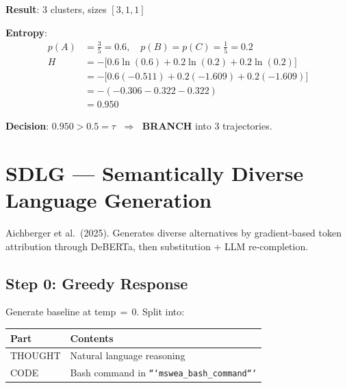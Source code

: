 \documentclass[10pt,a4paper,twocolumn]{article}
\begin{document}
\textbf{Result}: 3 clusters, sizes $[3, 1, 1]$

\textbf{Entropy}:
\begin{align*}
p(A) &= \tfrac{3}{5} = 0.6, \quad p(B) = p(C) = \tfrac{1}{5} = 0.2 \\[4pt]
H &= -\bigl[0.6\ln(0.6) + 0.2\ln(0.2) + 0.2\ln(0.2)\bigr] \\
  &= -\bigl[0.6(-0.511) + 0.2(-1.609) + 0.2(-1.609)\bigr] \\
  &= -(-0.306 - 0.322 - 0.322) \\
  &= \mathbf{0.950}
\end{align*}

\textbf{Decision}: $0.950 > 0.5 = \tau$ $\;\Longrightarrow\;$ \textbf{BRANCH} into 3 trajectories.


\section{SDLG --- Semantically Diverse Language Generation}

Aichberger et al.\ (2025). Generates diverse alternatives by gradient-based token attribution through DeBERTa, then substitution + LLM re-completion.

\begin{center}
\end{center}

\subsection{Step 0: Greedy Response}

Generate baseline at temp$\,{=}\,$0. Split into:

\begin{small}
\begin{tabular}{@{}ll@{}}
\toprule
\textbf{Part} & \textbf{Contents} \\
\midrule
THOUGHT & Natural language reasoning \\
CODE & Bash command in \texttt{```mswea\_bash\_command```} \\
\bottomrule
\end{tabular}
\end{small}
\end{document}
